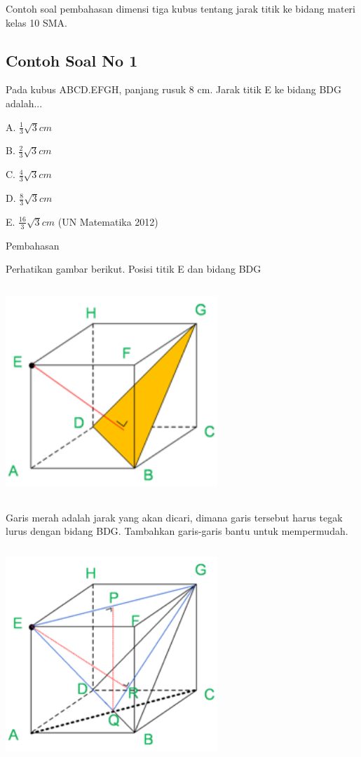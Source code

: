 \documentclass[11pt,fleqn]{book} %
\begin{document}
	Contoh soal pembahasan dimensi tiga kubus tentang jarak titik ke bidang materi kelas 10 SMA.
	
\subsection{Contoh Soal No 1}

	Pada kubus ABCD.EFGH, panjang rusuk 8 cm. Jarak titik E ke bidang BDG adalah...
	
	A. $\frac{1}{3}\sqrt{3} cm$
	
	B. $\frac{2}{3}\sqrt{3} cm$

	C. $\frac{4}{3}\sqrt{3} cm$

	D. $\frac{8}{3}\sqrt{3} cm$

	E. $\frac{16}{3}\sqrt{3} cm$
(UN Matematika 2012)

	Pembahasan
	
Perhatikan gambar berikut. Posisi titik E dan bidang BDG 


\includegraphics[width = 8cm, height= 8cm]{Pictures/dede9.png}



	Garis merah adalah jarak yang akan dicari, dimana garis tersebut harus tegak lurus dengan bidang BDG. Tambahkan garis-garis bantu untuk mempermudah.

\includegraphics[width = 8cm, height= 8cm]{Pictures/dede10.png}
\end{document}
